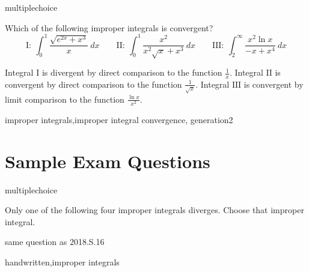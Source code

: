 \documentclass{ximera}
\begin{document}
\begin{question}[ImpropCD08]
\begin{type}
multiplechoice
\end{type}
Which of the following improper integrals is convergent? 
\[ \mathrm{I}: \ \int_0^1\frac{\sqrt{{e^{2x}}+{x^3}}}{{x}}~dx \qquad   \mathrm{II}: \ \int_0^1\frac{{x^2}}{{x^2}{\sqrt{x}}+{x^3}}~dx \qquad  \mathrm{III}: \ \int_{2}^\infty\frac{{x^2}{\ln x}}{-{x}+{x^4}}~dx\]
\begin{multiplechoice}
 \choicebreak
{}
\end{multiplechoice}
\begin{feedback}
Integral \(\mathrm{I}\) is divergent by direct comparison to the function \(\displaystyle \frac{{1}}{{x}}\). 
Integral \(\mathrm{II}\) is convergent by direct comparison to the function \(\displaystyle \frac{{1}}{{\sqrt{x}}}\). 
Integral \(\mathrm{III}\) is convergent by limit comparison to the function \(\displaystyle \frac{{\ln x}}{{x^2}}\).
\end{feedback}
\begin{keywords}
improper integrals,improper integral convergence, generation2
\end{keywords}
\end{question}

\section*{Sample Exam Questions}

\begin{question}[2016C.06]
\begin{type}
multiplechoice
\end{type}
Only one of the following four improper integrals diverges. Choose that improper integral. 
\begin{multiplechoice}
\end{multiplechoice}
\begin{notes}
same question as 2018.S.16
\end{notes}
\begin{keywords}
handwritten,improper integrals
\end{keywords}
\end{question}
\end{document}
